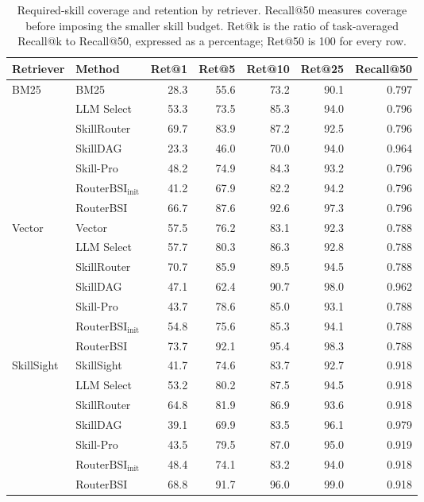 \begin{table}[t]
\centering
\small
\begin{tabular*}{\textwidth}{@{\extracolsep{\fill}}llrrrrr@{}}
\toprule
Retriever & Method & Ret@1 & Ret@5 & Ret@10 & Ret@25 & Recall@50 \\
\midrule
BM25 & BM25 & 28.3 & 55.6 & 73.2 & 90.1 & 0.797 \\
 & LLM Select & 53.3 & 73.5 & 85.3 & 94.0 & 0.796 \\
 & SkillRouter & 69.7 & 83.9 & 87.2 & 92.5 & 0.796 \\
 & SkillDAG & 23.3 & 46.0 & 70.0 & 94.0 & 0.964 \\
 & Skill-Pro & 48.2 & 74.9 & 84.3 & 93.2 & 0.796 \\
 & $\mathrm{RouterBSI}_{\mathrm{init}}$ & 41.2 & 67.9 & 82.2 & 94.2 & 0.796 \\
 & RouterBSI & 66.7 & 87.6 & 92.6 & 97.3 & 0.796 \\
\midrule
Vector & Vector & 57.5 & 76.2 & 83.1 & 92.3 & 0.788 \\
 & LLM Select & 57.7 & 80.3 & 86.3 & 92.8 & 0.788 \\
 & SkillRouter & 70.7 & 85.9 & 89.5 & 94.5 & 0.788 \\
 & SkillDAG & 47.1 & 62.4 & 90.7 & 98.0 & 0.962 \\
 & Skill-Pro & 43.7 & 78.6 & 85.0 & 93.1 & 0.788 \\
 & $\mathrm{RouterBSI}_{\mathrm{init}}$ & 54.8 & 75.6 & 85.3 & 94.1 & 0.788 \\
 & RouterBSI & 73.7 & 92.1 & 95.4 & 98.3 & 0.788 \\
\midrule
SkillSight & SkillSight & 41.7 & 74.6 & 83.7 & 92.7 & 0.918 \\
 & LLM Select & 53.2 & 80.2 & 87.5 & 94.5 & 0.918 \\
 & SkillRouter & 64.8 & 81.9 & 86.9 & 93.6 & 0.918 \\
 & SkillDAG & 39.1 & 69.9 & 83.5 & 96.1 & 0.979 \\
 & Skill-Pro & 43.5 & 79.5 & 87.0 & 95.0 & 0.919 \\
 & $\mathrm{RouterBSI}_{\mathrm{init}}$ & 48.4 & 74.1 & 83.2 & 94.0 & 0.918 \\
 & RouterBSI & 68.8 & 91.7 & 96.0 & 99.0 & 0.918 \\
\bottomrule
\end{tabular*}
\caption{Required-skill coverage and retention by retriever. Recall@50 measures coverage before imposing the smaller skill budget. Ret@k is the ratio of task-averaged Recall@k to Recall@50, expressed as a percentage; Ret@50 is 100 for every row.}
\label{tab:app-retention}
\end{table}
